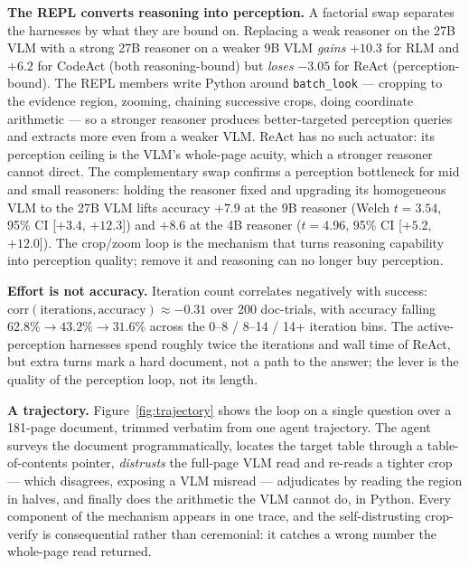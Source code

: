 \textbf{The REPL converts reasoning into perception.} A factorial swap separates the harnesses by what they are bound on. Replacing a weak reasoner on the 27B VLM with a strong 27B reasoner on a weaker 9B VLM \emph{gains} $+10.3$ for RLM and $+6.2$ for CodeAct (both reasoning-bound) but \emph{loses} $-3.05$ for ReAct (perception-bound). The REPL members write Python around \texttt{batch\_look} --- cropping to the evidence region, zooming, chaining successive crops, doing coordinate arithmetic --- so a stronger reasoner produces better-targeted perception queries and extracts more even from a weaker VLM. ReAct has no such actuator: its perception ceiling is the VLM's whole-page acuity, which a stronger reasoner cannot direct. The complementary swap confirms a perception bottleneck for mid and small reasoners: holding the reasoner fixed and upgrading its homogeneous VLM to the 27B VLM lifts accuracy $+7.9$ at the 9B reasoner (Welch $t{=}3.54$, 95\% CI [$+3.4$, $+12.3$]) and $+8.6$ at the 4B reasoner ($t{=}4.96$, 95\% CI [$+5.2$, $+12.0$]). The crop/zoom loop is the mechanism that turns reasoning capability into perception quality; remove it and reasoning can no longer buy perception.

\textbf{Effort is not accuracy.} Iteration count correlates negatively with success: $\mathrm{corr}(\text{iterations}, \text{accuracy}) \approx -0.31$ over 200 doc-trials, with accuracy falling $62.8\% \rightarrow 43.2\% \rightarrow 31.6\%$ across the 0--8 / 8--14 / 14+ iteration bins. The active-perception harnesses spend roughly twice the iterations and wall time of ReAct, but extra turns mark a hard document, not a path to the answer; the lever is the quality of the perception loop, not its length.

\textbf{A trajectory.} Figure~\ref{fig:trajectory} shows the loop on a single question over a 181-page document, trimmed verbatim from one agent trajectory. The agent surveys the document programmatically, locates the target table through a table-of-contents pointer, \emph{distrusts} the full-page VLM read and re-reads a tighter crop --- which disagrees, exposing a VLM misread --- adjudicates by reading the region in halves, and finally does the arithmetic the VLM cannot do, in Python. Every component of the mechanism appears in one trace, and the self-distrusting crop-verify is consequential rather than ceremonial: it catches a wrong number the whole-page read returned.



